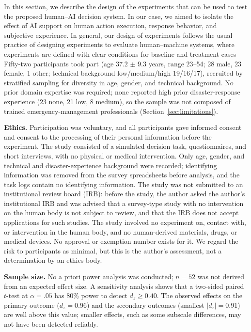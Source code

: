 \documentclass[journal]{IEEEtran}
\theoremstyle{plain}
\theoremstyle{definition}
\providecommand{\DIFaddtex}[1]{{\protect\color{blue} \sf #1}} %
\providecommand{\DIFdeltex}[1]{{\protect\color{red} \scriptsize #1}} %
\providecommand{\DIFaddbegin}{} %
\providecommand{\DIFaddend}{} %
\providecommand{\DIFdelbegin}{} %
\providecommand{\DIFdelend}{} %
\providecommand{\DIFadd}[1]{\texorpdfstring{\DIFaddtex{#1}}{#1}} %
\providecommand{\DIFdel}[1]{\texorpdfstring{\DIFdeltex{#1}}{}} %
\newcommand{\DIFscaledelfig}{0.5}
\newlength{\DIFdelgraphicswidth} %
\newlength{\DIFdelgraphicsheight} %
\newcommand{\DIFaddincludegraphics}[2][]{{\color{blue}\fbox{\DIFOincludegraphics[#1]{#2}}}} %
\newcommand{\DIFdelincludegraphics}[2][]{%
\sbox{\DIFdelgraphicsbox}{\DIFOincludegraphics[#1]{#2}}%
\settoboxwidth{\DIFdelgraphicswidth}{\DIFdelgraphicsbox} %
\settoboxtotalheight{\DIFdelgraphicsheight}{\DIFdelgraphicsbox} %
\scalebox{\DIFscaledelfig}{%
\parbox[b]{\DIFdelgraphicswidth}{\usebox{\DIFdelgraphicsbox}\\[-\baselineskip] \rule{\DIFdelgraphicswidth}{0em}}\llap{\resizebox{\DIFdelgraphicswidth}{\DIFdelgraphicsheight}{%
\setlength{\unitlength}{\DIFdelgraphicswidth}%
\begin{picture}(1,1)%
\thicklines\linethickness{2pt} %
{\color[rgb]{1,0,0}\put(0,0){\framebox(1,1){}}}%
{\color[rgb]{1,0,0}\put(0,0){\line( 1,1){1}}}%
{\color[rgb]{1,0,0}\put(0,1){\line(1,-1){1}}}%
\end{picture}%
}\hspace*{3pt}}} %
} %
\DeclareRobustCommand{\DIFaddbegin}{\DIFOaddbegin \let\includegraphics\DIFaddincludegraphics} %
\DeclareRobustCommand{\DIFaddend}{\DIFOaddend \let\includegraphics\DIFOincludegraphics} %
\DeclareRobustCommand{\DIFdelbegin}{\DIFOdelbegin \let\includegraphics\DIFdelincludegraphics} %
\DeclareRobustCommand{\DIFdelend}{\DIFOaddend \let\includegraphics\DIFOincludegraphics} %
\begin{document}
    \DIFdelbegin \DIFdel{In this section, we describe the design of the experiments that can be used to test the proposed human--AI decision system. In our case, we aimed to isolate the effect of AI support on human action execution, response behavior, and subjective experience. In general, our design of experiments follows the usual practice of designing experiments to evaluate human--machine systems, where experiments are defined with clear conditions for baseline and treatment cases}\DIFdelend \DIFaddbegin \DIFadd{Fifty-two participants took part (age 37.2 $\pm$ 9.3 years, range 23--54; 28 male, 23 female, 1 other; technical background low/medium/high 19/16/17), recruited by stratified sampling for diversity in age, gender, and technical background. No prior domain expertise was required; none reported high prior disaster-response experience (23 none, 21 low, 8 medium), so the sample was not composed of trained emergency-management professionals (Section~\ref{sec:limitations}).
}

    \DIFadd{\textbf{Ethics.} Participation was voluntary, and all participants gave informed consent and consent to the processing of their personal information before the experiment. The study consisted of a simulated decision task, questionnaires, and short interviews, with no physical or medical intervention. Only age, gender, and technical and disaster-experience background were recorded; identifying information was removed from the survey spreadsheets before analysis, and the task logs contain no identifying information. The study was not submitted to an institutional review board (IRB): before the study, the author asked the author's institutional IRB and was advised that a survey-type study with no intervention on the human body is not subject to review, and that the IRB does not accept applications for such studies. The study involved no experiment on, contact with, or intervention in the human body, and no human-derived materials, drugs, or medical devices. No approval or exemption number exists for it. We regard the risk to participants as minimal, but this is the author's assessment, not a determination by an ethics body.
}

    \DIFadd{\textbf{Sample size.} No a priori power analysis was conducted; $n=52$ was not derived from an expected effect size. A sensitivity analysis shows that a two-sided paired $t$-test at $\alpha=.05$ has 80\% power to detect $d_z \geq 0.40$. The observed effects on the primary outcome ($d_z = 0.96$) and the secondary outcomes (smallest $|d_z| = 0.91$) are well above this value; smaller effects, such as some subscale differences, may not have been detected reliably}\DIFaddend .
\end{document}
